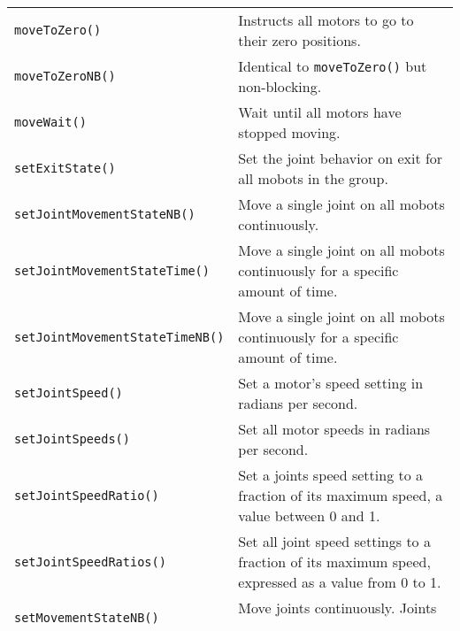 \begin{tabular}{p{1.75in}p{4.5in}}
\texttt{moveToZero()} & Instructs all motors to go to their zero positions. \\
\texttt{moveToZeroNB()} & Identical to \texttt{moveToZero()} but non-blocking. \\
\texttt{moveWait()} & Wait until all motors have stopped moving. \\
\texttt{setExitState()} & Set the joint behavior on exit for all mobots in the group. \\
\texttt{setJointMovementStateNB()} & Move a single joint on all mobots continuously. \\
\texttt{setJointMovementStateTime()} & Move a single joint on all mobots continuously for a specific amount of time. \\
\texttt{setJointMovementStateTimeNB()} & Move a single joint on all mobots continuously for a specific amount of time. \\
\texttt{setJointSpeed()} & Set a motor's speed setting in radians per second. \\
\texttt{setJointSpeeds()} & Set all motor speeds in radians per second. \\
\texttt{setJointSpeedRatio()} & Set a joints speed setting to a fraction of its maximum speed, a value between 0 and 1. \\
\texttt{setJointSpeedRatios()} & Set all joint speed settings to a fraction of its
maximum speed, expressed as a value from 0 to 1. \\
\texttt{setMovementStateNB()} & Move joints continuously. Joints will move untill stopped.\\
\texttt{setMovementStateTime()} & Move joints continuously for a certain amount of time.\\
\texttt{setMovementStateTimeNB()} & Move joints continuously for a certain amount of time.\\
\texttt{setTwoWheelRobotSpeed()} & Move the mobots at a constant forward velocity. \\
\texttt{stop()} & Stop all currently executing motions of the mobot. \\
\texttt{turnLeft()}  & Rotate the mobots counterclockwise. \\
\texttt{turnLeftNB()}  & Identical to \texttt{turnLeft()} but non-blocking. \\
\texttt{turnRight()}  & Rotate the mobots clockwise. \\
\texttt{turnRightNB()}  & Identical to \texttt{turnRight()} but non-blocking. \\
\hline
\end{tabular}

